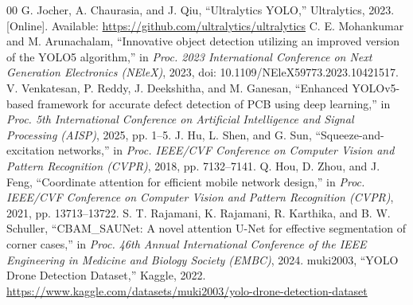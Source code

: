 \documentclass[conference]{IEEEtran}
\begin{document}
\begin{thebibliography}{00}
 G. Jocher, A. Chaurasia, and J. Qiu, ``Ultralytics YOLO,'' Ultralytics, 2023. [Online]. Available: \url{https://github.com/ultralytics/ultralytics}
 C. E. Mohankumar and M. Arunachalam, ``Innovative object detection utilizing an improved version of the YOLO5 algorithm,'' in \textit{Proc. 2023 International Conference on Next Generation Electronics (NEleX)}, 2023, doi: 10.1109/NEleX59773.2023.10421517.
 V. Venkatesan, P. Reddy, J. Deekshitha, and M. Ganesan, ``Enhanced YOLOv5-based framework for accurate defect detection of PCB using deep learning,'' in \textit{Proc. 5th International Conference on Artificial Intelligence and Signal Processing (AISP)}, 2025, pp. 1--5.
 J. Hu, L. Shen, and G. Sun, ``Squeeze-and-excitation networks,'' in \textit{Proc. IEEE/CVF Conference on Computer Vision and Pattern Recognition (CVPR)}, 2018, pp. 7132--7141.
 Q. Hou, D. Zhou, and J. Feng, ``Coordinate attention for efficient mobile network design,'' in \textit{Proc. IEEE/CVF Conference on Computer Vision and Pattern Recognition (CVPR)}, 2021, pp. 13713--13722.
 S. T. Rajamani, K. Rajamani, R. Karthika, and B. W. Schuller, ``CBAM\_SAUNet: A novel attention U-Net for effective segmentation of corner cases,'' in \textit{Proc. 46th Annual International Conference of the IEEE Engineering in Medicine and Biology Society (EMBC)}, 2024.
 muki2003, ``YOLO Drone Detection Dataset,'' Kaggle, 2022. \url{https://www.kaggle.com/datasets/muki2003/yolo-drone-detection-dataset}
\end{thebibliography}
\end{document}
